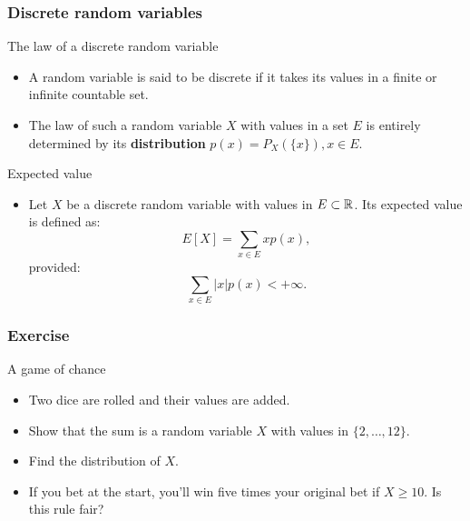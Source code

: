 \documentclass[main.tex]{subfiles}
\begin{document}
\begin{frame}
    \frametitle{Discrete random variables}
\begin{block}{The law of a discrete random variable}
    \begin{itemize}
        \item<+-> A random variable is said to be discrete if it takes its 
        values in a finite or infinite countable set.
        \item<+-> The law of such a random variable $X$ with values in a set $E$ is entirely determined
        by its \textbf{distribution} $p(x) = P_X\left( \{x\} \right), x \in E.$
    \end{itemize}
\end{block}
\begin{block}{Expected value}
    \begin{itemize}
        \item<+-> Let $X$ be a discrete random variable with values in $E\subset \mathbb{R}$. 
        Its expected value is defined as:
        \begin{equation}
            E\left[ X \right] = \sum_{x \in E} x p(x),
        \end{equation}
        provided:
        \begin{equation}
            \sum_{x \in E} \lvert x \rvert p(x)< +\infty.
         \end{equation}
    \end{itemize}
\end{block}
\end{frame}
\begin{frame}
    \frametitle{Exercise}
\begin{block}{A game of chance}
    \begin{itemize}
        \item<+-> Two dice are rolled and their values are added.
        \item<+-> Show that the sum is a random variable $X$ with values in 
        $\{2, \dots, 12 \}.$
        \item<+-> Find the distribution of $X$.
        \item<+-> If you bet at the start, you'll win five times
         your original bet if $X \geq 10.$ Is this rule fair?
    \end{itemize}
\end{block}
\end{frame}
\end{document}
